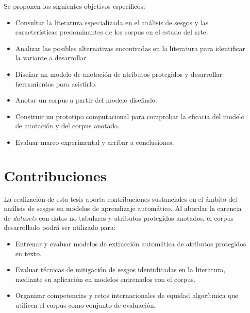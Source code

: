 Se proponen los siguientes objetivos espec\'ificos:
\begin{itemize}
    \item Consultar la literatura especializada en el an\'alisis de sesgos y las caracter\'isticas predominantes de los corpus en el estado del arte.
    \item Analizar las posibles alternativas encontradas en la literatura para identificar la variante a desarrollar.
    \item Dise\~nar un modelo de anotaci\'on de atributos protegidos y desarrollar herramientas para asistirlo.
    \item Anotar un corpus a partir del modelo dise\~nado.
    \item Construir un prototipo computacional para comprobar la eficacia del modelo de anotaci\'on y del corpus anotado.
    \item Evaluar marco experimental y arribar a conclusiones.
\end{itemize}

\section*{Contribuciones}
La realizaci\'on de esta tesis aporta contribuciones sustanciales en el \'ambito del an\'alisis de sesgos en modelos de aprendizaje 
autom\'atico. Al abordar la carencia de \emph{datasets} con datos no tabulares y atributos protegidos anotados, el corpus desarrollado podr\'a ser utilizado para:
\begin{itemize}
    \item Entrenar y evaluar modelos de extracci\'on autom\'atica de atributos protegidos en texto.
    \item Evaluar t\'ecnicas de mitigaci\'on de sesgos identidicadas en la literatura, mediante su aplicaci\'on en modelos entrenados con el corpus.
    \item Organizar competencias y retos internacionales de equidad algor\'itmica que utilicen el corpus como conjunto de evaluaci\'on.
\end{itemize}



